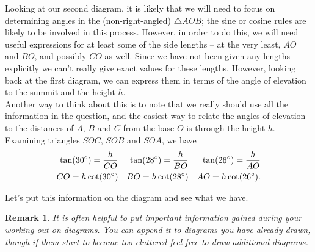 \documentclass[a4paper,11pt]{article}
\newtheorem*{remark}{Remark}
\begin{document}
\noindent Looking at our second diagram, it is likely that we will need to focus on determining angles in the (non-right-angled) $\triangle AOB$; the sine or cosine rules are likely to be involved in this process. However, in order to do this, we will need useful expressions for at least some of the side lengths -- at the very least, $AO$ and $BO$, and possibly $CO$ as well. Since we have not been given any lengths explicitly we can't really give exact values for these lengths. However, looking back at the first diagram, we can express them in terms of the angle of elevation to the summit and the height $h$.\\

\noindent Another way to think about this is to note that we really should use all the information in the question, and the easiest way to relate the angles of elevation to the distances of $A$, $B$ and $C$ from the base $O$ is through the height $h$.\\

\noindent Examining triangles $SOC$, $SOB$ and $SOA$, we have
\begin{align*}
\tan(30\degree) = \frac{h}{CO} && \tan(28\degree) = \frac{h}{BO} && \tan(26\degree) = \frac{h}{AO}\\
CO = h\cot(30\degree) && BO = h\cot(28\degree) && AO = h\cot(26\degree).
\end{align*}

\noindent Let's put this information on the diagram and see what we have.

\begin{center}
\end{center}

\begin{remark}\normalfont
It is often helpful to put important information gained during your working out on diagrams. You can append it to diagrams you have already drawn, though if them start to become too cluttered feel free to draw additional diagrams. 
\end{remark}
\end{document}
